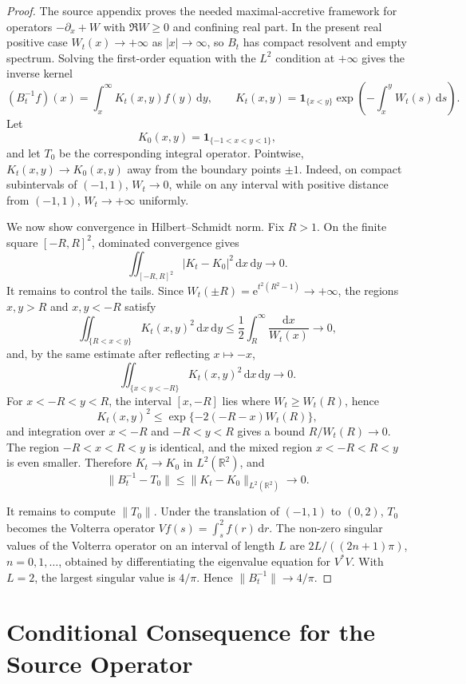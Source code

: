 \documentclass[11pt]{article}
\newcommand{\R}{\mathbb R}
\newcommand{\e}{\mathrm e}
\newcommand{\dd}{\mathrm d}
\begin{document}
\begin{proof}
The source appendix proves the needed maximal-accretive framework for
operators \(-\partial_x+W\) with \(\Re W\ge0\) and confining real part.  In the
present real positive case \(W_t(x)\to+\infty\) as \(|x|\to\infty\), so
\(B_t\) has compact resolvent and empty spectrum.  Solving the first-order
equation with the \(L^2\) condition at \(+\infty\) gives the inverse kernel
\[
    (B_t^{-1}f)(x)=\int_x^\infty K_t(x,y)f(y)\,\dd y,
    \qquad
    K_t(x,y)=\mathbf 1_{\{x<y\}}
       \exp\!\left(-\int_x^y W_t(s)\,\dd s\right).
\]
Let
\[
    K_0(x,y)=\mathbf 1_{\{-1<x<y<1\}},
\]
and let \(T_0\) be the corresponding integral operator.  Pointwise,
\(K_t(x,y)\to K_0(x,y)\) away from the boundary points \(\pm1\).  Indeed,
on compact subintervals of \((-1,1)\), \(W_t\to0\), while on any interval with
positive distance from \((-1,1)\), \(W_t\to+\infty\) uniformly.

We now show convergence in Hilbert--Schmidt norm.  Fix \(R>1\).  On
the finite square \([-R,R]^2\), dominated convergence gives
\[
    \iint_{[-R,R]^2}|K_t-K_0|^2\,\dd x\,\dd y \to0.
\]
It remains to control the tails.  Since \(W_t(\pm R)=\e^{t^2(R^2-1)}\to+\infty\),
the regions \(x,y>R\) and \(x,y<-R\) satisfy
\[
    \iint_{\{R<x<y\}}K_t(x,y)^2\,\dd x\,\dd y
      \le \frac{1}{2}\int_R^\infty \frac{\dd x}{W_t(x)}\to0,
\]
and, by the same estimate after reflecting \(x\mapsto -x\),
\[
    \iint_{\{x<y<-R\}}K_t(x,y)^2\,\dd x\,\dd y\to0.
\]
For \(x<-R<y<R\), the interval \([x,-R]\) lies where \(W_t\ge W_t(R)\), hence
\[
    K_t(x,y)^2\le \exp\{-2(-R-x)W_t(R)\},
\]
and integration over \(x<-R\) and \(-R<y<R\) gives a bound \(R/W_t(R)\to0\).
The region \(-R<x<R<y\) is identical, and the mixed region \(x<-R<R<y\) is
even smaller.  Therefore \(K_t\to K_0\) in \(L^2(\R^2)\), and
\[
    \|B_t^{-1}-T_0\|\le \|K_t-K_0\|_{L^2(\R^2)}\to0.
\]

It remains to compute \(\|T_0\|\).  Under the translation of \((-1,1)\) to
\((0,2)\), \(T_0\) becomes the Volterra operator \(Vf(s)=\int_s^2 f(r)\,\dd r\).
The non-zero singular values of the Volterra operator on an interval of length
\(L\) are \(2L/((2n+1)\pi)\), \(n=0,1,\ldots\), obtained by differentiating the
eigenvalue equation for \(V^*V\).  With \(L=2\), the largest singular value is
\(4/\pi\).  Hence \(\|B_t^{-1}\|\to4/\pi\).
\end{proof}

\section*{Conditional Consequence for the Source Operator}
\end{document}
